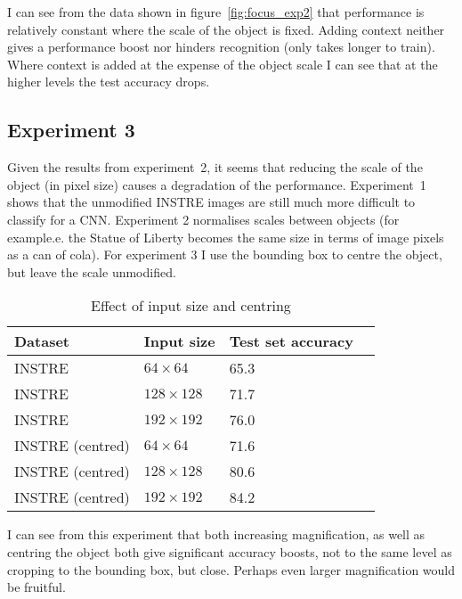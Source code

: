 I can see from the data shown in figure~\ref{fig:focus_exp2} that performance is relatively constant where the scale of the object is fixed. Adding context neither gives a performance boost nor hinders recognition (only takes longer to train). Where context is added at the expense of the object scale I can see that at the higher levels the test accuracy drops.


\subsection {Experiment 3}

Given the results from experiment~2, it seems that reducing the scale of the object (in pixel size) causes a degradation of the performance. Experiment~1 shows that the unmodified INSTRE images are still much more difficult to classify for a CNN. Experiment 2 normalises scales between objects (for example.e. the Statue of Liberty becomes the same size in terms of image pixels as a can of cola). For experiment 3 I use the bounding box to centre the object, but leave the scale unmodified.


\begin{table}[h]
  \centering
    \caption{Effect of input size and centring}
    
  \begin{tabular}{ l l l l }
    
    Dataset & Input size & Test set accuracy \\
    \toprule
    
    INSTRE &  $ 64 \times 64 $ & 65.3 \\
    INSTRE &  $ 128 \times 128 $  & 71.7 \\
    INSTRE &  $ 192 \times 192 $  & 76.0 \\
    
    \toprule
    INSTRE (centred) &  $ 64 \times 64 $ & 71.6 \\
    INSTRE (centred) &  $ 128 \times 128 $  & 80.6 \\
    INSTRE (centred) &  $ 192 \times 192 $  & 84.2 \\
    
    
    
    \bottomrule
  \end{tabular}
\label{fig:focus_input_size}
\end{table}



I can see from this experiment that both increasing magnification, as well as centring the object both give significant accuracy boosts, not to the same level as cropping to the bounding box, but close. Perhaps even larger magnification would be fruitful. 

